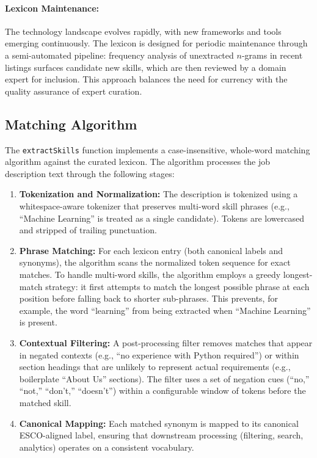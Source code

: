 \paragraph{Lexicon Maintenance:} The technology landscape evolves rapidly, with new frameworks and tools emerging continuously. The lexicon is designed for periodic maintenance through a semi-automated pipeline: frequency analysis of unextracted $n$-grams in recent listings surfaces candidate new skills, which are then reviewed by a domain expert for inclusion. This approach balances the need for currency with the quality assurance of expert curation.

\subsection{Matching Algorithm}

The \texttt{extractSkills} function implements a case-insensitive, whole-word matching algorithm against the curated lexicon. The algorithm processes the job description text through the following stages:

\begin{enumerate}
    \item \textbf{Tokenization and Normalization:} The description is tokenized using a whitespace-aware tokenizer that preserves multi-word skill phrases (e.g., ``Machine Learning'' is treated as a single candidate). Tokens are lowercased and stripped of trailing punctuation.
    \item \textbf{Phrase Matching:} For each lexicon entry (both canonical labels and synonyms), the algorithm scans the normalized token sequence for exact matches. To handle multi-word skills, the algorithm employs a greedy longest-match strategy: it first attempts to match the longest possible phrase at each position before falling back to shorter sub-phrases. This prevents, for example, the word ``learning'' from being extracted when ``Machine Learning'' is present.
    \item \textbf{Contextual Filtering:} A post-processing filter removes matches that appear in negated contexts (e.g., ``no experience with Python required'') or within section headings that are unlikely to represent actual requirements (e.g., boilerplate ``About Us'' sections). The filter uses a set of negation cues (``no,'' ``not,'' ``don't,'' ``doesn't'') within a configurable window of tokens before the matched skill.
    \item \textbf{Canonical Mapping:} Each matched synonym is mapped to its canonical ESCO-aligned label, ensuring that downstream processing (filtering, search, analytics) operates on a consistent vocabulary.
\end{enumerate}

